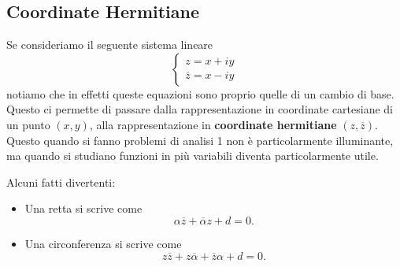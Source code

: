 \documentclass[11pt]{scrartcl}
\begin{document}
	\subsection{Coordinate Hermitiane}
	Se consideriamo il seguente sistema lineare
	\begin{equation}
		\begin{cases}
			z=x+iy \\
			\overline{z}=x-iy
		\end{cases}
	\end{equation}
	notiamo che in effetti queste equazioni sono proprio quelle di un cambio di base. Questo ci permette di passare dalla rappresentazione in coordinate cartesiane di un punto $(x,y)$, alla rappresentazione in \textbf{coordinate hermitiane} $(z,\overline{z})$. Questo quando si fanno problemi di analisi 1 non è particolarmente illuminante, ma quando si studiano funzioni in più variabili diventa particolarmente utile.
	\begin{fact} Alcuni fatti divertenti:
		\begin{itemize}
			\item Una retta si scrive come $$\alpha\overline{z}+\overline{\alpha}z+d=0.$$
			\item Una circonferenza si scrive come $$z\overline{z}+z\overline{\alpha}+\overline{z}\alpha+d=0.$$
		\end{itemize}
	\end{fact}
	

	\newpage
	
	
\end{document}
